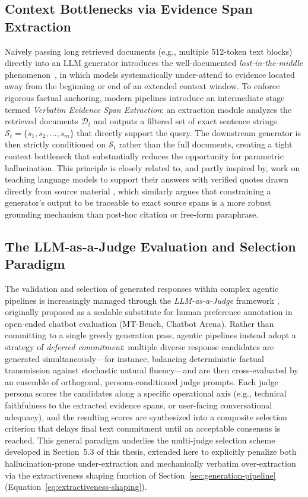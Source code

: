 \subsection{Context Bottlenecks via Evidence Span Extraction}

Naively passing long retrieved documents (e.g., multiple 512-token text blocks) directly into an LLM generator introduces the well-documented \textit{lost-in-the-middle} phenomenon~\citep{liu2024lost}, in which models systematically under-attend to evidence located away from the beginning or end of an extended context window. To enforce rigorous factual anchoring, modern pipelines introduce an intermediate stage termed \textit{Verbatim Evidence Span Extraction}: an extraction module analyzes the retrieved documents $\mathcal{D}_t$ and outputs a filtered set of exact sentence strings $\mathcal{S}_t = \{s_1, s_2, \dots, s_m\}$ that directly support the query. The downstream generator is then strictly conditioned on $\mathcal{S}_t$ rather than the full documents, creating a tight context bottleneck that substantially reduces the opportunity for parametric hallucination. This principle is closely related to, and partly inspired by, work on teaching language models to support their answers with verified quotes drawn directly from source material \citep{menick2022teaching}, which similarly argues that constraining a generator's output to be traceable to exact source spans is a more robust grounding mechanism than post-hoc citation or free-form paraphrase.

\subsection{The LLM-as-a-Judge Evaluation and Selection Paradigm}

The validation and selection of generated responses within complex agentic pipelines is increasingly managed through the \textit{LLM-as-a-Judge} framework \citep{zheng2023judging}, originally proposed as a scalable substitute for human preference annotation in open-ended chatbot evaluation (MT-Bench, Chatbot Arena). Rather than committing to a single greedy generation pass, agentic pipelines instead adopt a strategy of \textit{deferred commitment}: multiple diverse response candidates are generated simultaneously---for instance, balancing deterministic factual transmission against stochastic natural fluency---and are then cross-evaluated by an ensemble of orthogonal, persona-conditioned judge prompts. Each judge persona scores the candidates along a specific operational axis (e.g., technical faithfulness to the extracted evidence spans, or user-facing conversational adequacy), and the resulting scores are synthesized into a composite selection criterion that delays final text commitment until an acceptable consensus is reached. This general paradigm underlies the multi-judge selection scheme developed in Section~5.3 of this thesis, extended here to explicitly penalize both hallucination-prone under-extraction and mechanically verbatim over-extraction via the extractiveness shaping function of Section~\ref{sec:generation-pipeline} (Equation~\eqref{eq:extractiveness-shaping}).

